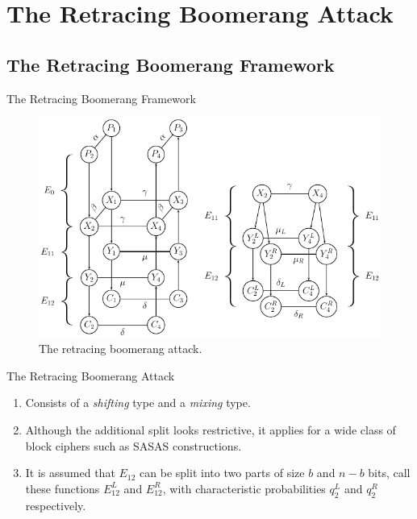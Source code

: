 \documentclass[notheorems]{beamer}
\theoremstyle{definition}
\theoremstyle{example}
\begin{document}
    \section[Retracing Boomerang Attack]{The Retracing Boomerang Attack}
    \label{sec:retr-boomerang}
    
    \subsection{The Retracing Boomerang Framework}
    \label{sec:retr-framework}

    \begin{frame}{The Retracing Boomerang Framework}
        \begin{figure}[!ht]
            \centering
            \includegraphics[width=0.65\columnwidth]{images/retracing_boomerang.png}
            \caption{The retracing boomerang attack.}
            \label{fig:retr-boomerang}
        \end{figure}
    \end{frame}

    \begin{frame}[<+->]{The Retracing Boomerang Attack}
        \begin{enumerate}
            \item Consists of a \emph{shifting} type and a \emph{mixing} type.
            \item Although the additional split looks restrictive, it applies
            for a wide class of block ciphers such as SASAS constructions.
            \item It is assumed that \(E_{12}\) can be split into two parts of
            size \(b\) and \(n - b\) bits, call these functions \(E_{12}^L\) and
            \(E_{12}^R\), with characteristic probabilities \(q_2^L\) and
            \(q_2^R\) respectively.
        \end{enumerate}
    \end{frame}
\end{document}
